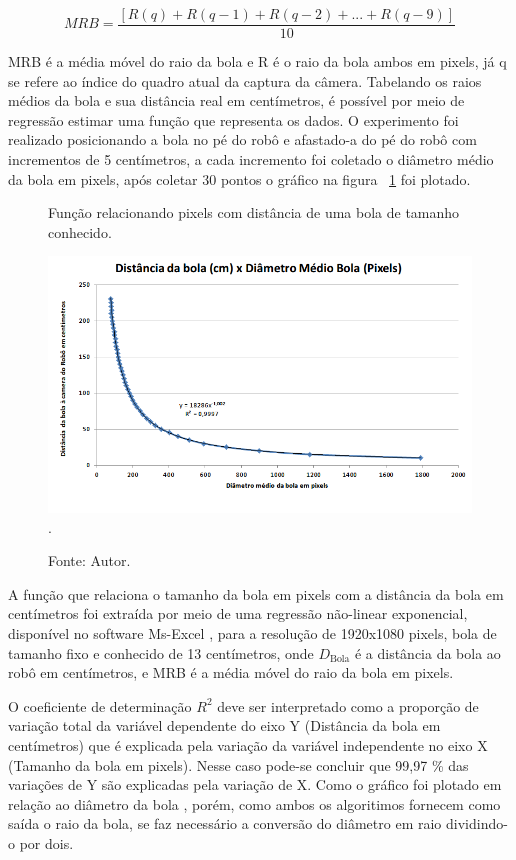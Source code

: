 \begin{equation} 
\label{eq:MM}
	MRB = \frac {[R(q) + R(q-1) + R(q-2) + . . . + R(q-9)]}  {10}
\end{equation}

MRB é a média móvel do raio da bola e R é o raio da bola ambos em pixels, já q se refere ao índice do quadro atual da captura da câmera. Tabelando os raios médios da bola e sua distância real em centímetros, é possível por meio de regressão estimar uma função que representa os dados. O experimento foi realizado posicionando a bola no pé do robô e afastado-a do pé do robô com incrementos de 5 centímetros, a cada incremento foi coletado o diâmetro médio da bola em pixels, após coletar 30 pontos o gráfico na figura ~\ref{Fig:DistBall} foi plotado. 

\begin{figure}[!t]
\centering \caption{Função relacionando pixels com distância de uma bola de tamanho conhecido.}
\includegraphics[width=15cm]{Imagens/Dist.png}
\DeclareGraphicsExtensions.
\caption*{Fonte: Autor.}
\label{Fig:DistBall}
\end{figure}

A função que relaciona o tamanho da bola em pixels com a distância da bola em centímetros foi extraída por meio de uma regressão não-linear exponencial, disponível no software Ms-Excel \cite{MS}, para a resolução de 1920x1080 pixels, bola de tamanho fixo e conhecido de 13 centímetros, onde \(D_{\text{Bola}}\) é a distância da bola ao robô em centímetros, e MRB é a média móvel do raio da bola em pixels.

O coeficiente de determinação \(R^2\) deve ser interpretado como a proporção de variação total da variável dependente do eixo Y (Distância da bola em centímetros) que é explicada pela variação da variável independente no eixo X (Tamanho da bola em pixels). Nesse caso pode-se concluir que 99,97 \% das variações de Y são explicadas pela variação de X. Como o gráfico foi plotado em relação ao diâmetro da bola , porém, como ambos os algoritimos fornecem como saída o raio da bola, se faz necessário a conversão do diâmetro em raio dividindo-o por dois.


